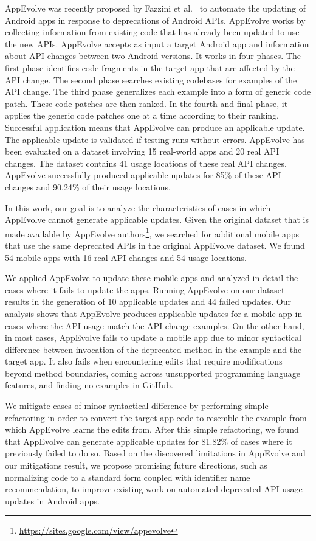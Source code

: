 AppEvolve was recently proposed by Fazzini et al.~\cite{fazzini2019automated} to
automate the updating of Android apps in response to deprecations of
Android APIs.  AppEvolve works by collecting information from existing code
that has already been updated to use the new APIs. 
AppEvolve accepts as input a target Android app and information about API changes between two Android versions. It works in four phases. The first phase identifies code fragments in the target app that are affected by the API change. The second phase searches existing codebases for examples of the API change. The third phase generalizes each example into a form of generic code patch. These code patches are then ranked. In the fourth and final phase, it applies the generic code patches one at a time according to their ranking. Successful application means that AppEvolve can produce an applicable  update. The applicable update is validated if testing runs without errors. AppEvolve has been evaluated on a dataset involving 15 real-world apps and 20 real API changes. The dataset contains 41 usage locations of these real API changes. AppEvolve successfully produced applicable updates for 85\% of these API changes and 90.24\% of their usage locations. 

In this work, our goal is to analyze the characteristics of cases in which AppEvolve cannot generate applicable updates. Given the original dataset that is made available by AppEvolve authors\footnote{\url{https://sites.google.com/view/appevolve}}, we searched for additional mobile apps that use the same deprecated APIs in the original AppEvolve dataset. We found 54 mobile apps with 16 real API changes and 54 usage locations. 

We applied AppEvolve to update these mobile apps and analyzed in detail the cases where it fails to update the apps. Running AppEvolve on our dataset results in the generation of 10 applicable updates and 44 failed updates. Our analysis shows that AppEvolve produces applicable updates for a mobile app in cases where the API usage match the API change examples.  On the other hand, in most cases, AppEvolve fails to update a mobile app due to minor syntactical difference between invocation of the deprecated method in the example and the target app. It also fails when encountering edits that require modifications beyond method boundaries, coming across unsupported programming language features, and finding no examples  in GitHub.

We mitigate cases of minor syntactical difference by performing simple refactoring in order to convert the target app code to resemble the example from which AppEvolve learns the edits from. After this simple refactoring, we found that AppEvolve can generate applicable updates for 81.82\% of cases where it previously failed to do so. Based on the discovered limitations in AppEvolve and our mitigations result, we propose promising future directions, such as normalizing code to a standard form coupled with identifier name recommendation, to improve existing work on automated deprecated-API usage updates in Android apps.

